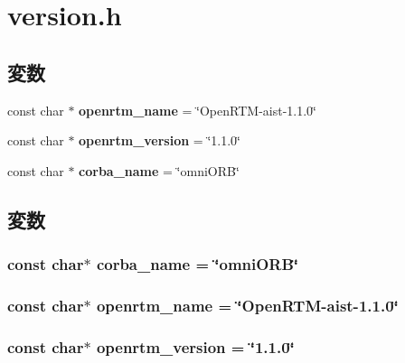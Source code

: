 \section{version.h}
\label{version_8h}
\subsection*{変数}
\begin{DoxyCompactItemize}
\item 
const char $\ast$ {\bf openrtm\_\-name} = \char`\"{}OpenRTM-\/aist-\/1.1.0\char`\"{}
\item 
const char $\ast$ {\bf openrtm\_\-version} = \char`\"{}1.1.0\char`\"{}
\item 
const char $\ast$ {\bf corba\_\-name} = \char`\"{}omniORB\char`\"{}
\end{DoxyCompactItemize}


\subsection{変数}
\subsubsection[{corba\_\-name}]{\setlength{\rightskip}{0pt plus 5cm}const char$\ast$ {\bf corba\_\-name} = \char`\"{}omniORB\char`\"{}}\label{version_8h_ad27a64b894af70258b4d529f27be0bce}
\subsubsection[{openrtm\_\-name}]{\setlength{\rightskip}{0pt plus 5cm}const char$\ast$ {\bf openrtm\_\-name} = \char`\"{}OpenRTM-\/aist-\/1.1.0\char`\"{}}\label{version_8h_a058007c718cf04f129211045c4593f8c}
\subsubsection[{openrtm\_\-version}]{\setlength{\rightskip}{0pt plus 5cm}const char$\ast$ {\bf openrtm\_\-version} = \char`\"{}1.1.0\char`\"{}}\label{version_8h_ab0567f69d63c309cf37d268117eda67d}
